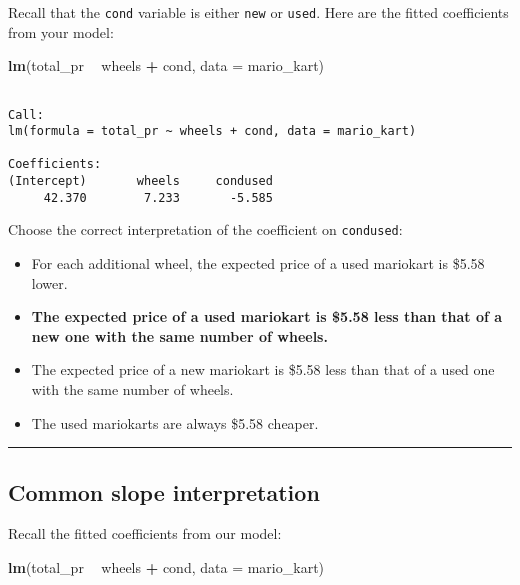 \documentclass[
]{book}
\newenvironment{Shaded}{\begin{snugshade}}{\end{snugshade}}
\newcommand{\DataTypeTok}[1]{\textcolor[rgb]{0.13,0.29,0.53}{#1}}
\newcommand{\KeywordTok}[1]{\textcolor[rgb]{0.13,0.29,0.53}{\textbf{#1}}}
\newcommand{\NormalTok}[1]{#1}
\newcommand{\OperatorTok}[1]{\textcolor[rgb]{0.81,0.36,0.00}{\textbf{#1}}}
\newcommand{\StringTok}[1]{\textcolor[rgb]{0.31,0.60,0.02}{#1}}
\begin{document}
Recall that the \texttt{cond} variable is either \texttt{new} or \texttt{used}. Here are the fitted coefficients from your model:

\begin{Shaded}
\begin{Highlighting}[]
\KeywordTok{lm}\NormalTok{(total_pr }\OperatorTok{~}\StringTok{ }\NormalTok{wheels }\OperatorTok{+}\StringTok{ }\NormalTok{cond, }\DataTypeTok{data =}\NormalTok{ mario_kart)}
\end{Highlighting}
\end{Shaded}

\begin{verbatim}

Call:
lm(formula = total_pr ~ wheels + cond, data = mario_kart)

Coefficients:
(Intercept)       wheels     condused  
     42.370        7.233       -5.585  
\end{verbatim}

Choose the correct interpretation of the coefficient on \texttt{condused}:

\begin{itemize}
\item
  For each additional wheel, the expected price of a used mariokart is \$5.58 lower.
\item
  \textbf{The expected price of a used mariokart is \$5.58 less than that of a new one with the same number of wheels.}
\item
  The expected price of a new mariokart is \$5.58 less than that of a used one with the same number of wheels.
\item
  The used mariokarts are always \$5.58 cheaper.
\end{itemize}

\begin{center}\rule{0.5\linewidth}{0.5pt}\end{center}

\hypertarget{common-slope-interpretation}{%
\subsection*{Common slope interpretation}\label{common-slope-interpretation}}

Recall the fitted coefficients from our model:

\begin{Shaded}
\begin{Highlighting}[]
\KeywordTok{lm}\NormalTok{(total_pr }\OperatorTok{~}\StringTok{ }\NormalTok{wheels }\OperatorTok{+}\StringTok{ }\NormalTok{cond, }\DataTypeTok{data =}\NormalTok{ mario_kart)}
\end{Highlighting}
\end{Shaded}
\end{document}
